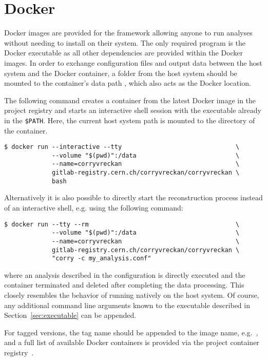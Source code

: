\section{Docker}
\label{sec:docker}
Docker images are provided for the framework allowing anyone to run analyses without needing to install \corry on their system.
The only required program is the Docker executable as all other dependencies are provided within the Docker images.
In order to exchange configuration files and output data between the host system and the Docker container, a folder from the host system should be mounted to the container's data path , which also acts as the Docker  location.

The following command creates a container from the latest Docker image in the project registry and starts an interactive shell session with the  executable already in the \texttt{\$PATH}.
Here, the current host system path is mounted to the  directory of the container.

\begin{verbatim}
$ docker run --interactive --tty                               \
             --volume "$(pwd)":/data                           \
             --name=corryvreckan                               \
             gitlab-registry.cern.ch/corryvreckan/corryvreckan \
             bash
\end{verbatim}

Alternatively it is also possible to directly start the reconstruction process instead of an interactive shell, e.g. using the following command:
\begin{verbatim}
$ docker run --tty --rm                                        \
             --volume "$(pwd)":/data                           \
             --name=corryvreckan                               \
             gitlab-registry.cern.ch/corryvreckan/corryvreckan \
             "corry -c my_analysis.conf"
\end{verbatim}
where an analysis described in the configuration \file{my_analysis.conf} is directly executed and the container terminated and deleted after completing the data processing.
This closely resembles the behavior of running \corry natively on the host system.
Of course, any additional command line arguments known to the  executable described in Section~\ref{sec:executable} can be appended.

For tagged versions, the tag name should be appended to the image name, e.g.\ , and a full list of available Docker containers is provided via the project container registry~\cite{corry-container-registry}.

